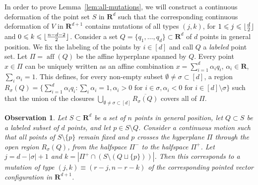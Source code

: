 \documentclass[11pt]{article}
\newtheorem{observation}[theorem]{Observation}
\DeclareMathOperator{\aff}{aff}
\renewcommand{\leq}{\leqslant}
\newcommand{\R}{\mathbf{R}}
\DeclarePairedDelimiter\floor{\lfloor}{\rfloor}
\begin{document}
In order to prove Lemma~\ref{lem:all-mutations}, we will construct a continuous deformation of the point set $S$ in $\R^d$ such that the corresponding continuous deformation of $V$ in $\R^{d+1}$ contains mutations of all types $(j,k)$, for  $1 \leq j \leq \floor{\frac{d}{2}}$ and $0 \leq k \leq \floor{\frac{n-d-2}{2}}$. 
%
Consider a set $Q=\{q_1,\dots,q_d\}\subset \R^d$ of $d$ points in general position. We fix the labeling of the points by $i\in [d]$ and call $Q$ a \emph{labeled} point set.
Let $\Pi=\aff(Q)$ be the affine hyperplane spanned by $Q$. Every point $x\in \Pi$ can be uniquely written as an affine combination $x=\sum_{i=1}^d \alpha_i q_i$, $\alpha_i \in \R$, $\sum_i \alpha_i =1$. This defines, for every non-empty subset 
$\emptyset \neq \sigma \subset [d]$, a region  $R_\sigma(Q)=\{\sum_{i=1}^d \alpha_i q_i \colon \sum_i \alpha_i =1, \alpha_i >0 \textrm{ for } i\in \sigma, \alpha_i<0 \textrm{ for } i\in [d]\setminus \sigma\}$ such that the union of the closures 
$\bigcup_{\emptyset \neq \sigma \subset [d]} \overline{R_\sigma(Q)}$ covers all of $\Pi$.
%
\begin{observation}
\label{obs:point-mutation}
Let $S \subset \R^d$ be a set of $n$ points in general position, let $Q\subset S$ be a labeled subset of $d$ points, and let $p\in S\setminus Q$. Consider a continuous motion such that all points of $S\setminus \{p\}$ remain fixed and $p$ crosses the hyperplane $\Pi$ through the open region $R_{\sigma}(Q)$, from the halfspace $\Pi^-$ to the halfspace $\Pi^+$. Let $j=d-|\sigma|+1$ and $k=|\Pi^+ \cap (S\setminus (Q \sqcup \{p\}))|$. Then this corresponds to a mutation of type $(j,k)\equiv (r-j,n-r-k)$ of the corresponding pointed vector  configuration in $\R^{d+1}$.
\end{observation}
%
\end{document}
